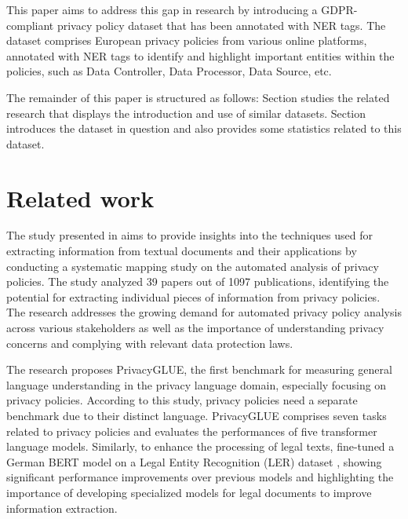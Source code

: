 \documentclass[a4paper,
               biblatex,     %
               hyphens,      %
               ]{jacow}
\begin{document}
This paper aims to address this gap in research by introducing a GDPR-compliant privacy policy dataset that has been annotated with NER tags. The dataset comprises European privacy policies from various online platforms, annotated with NER tags to identify and highlight important entities within the policies, such as Data Controller, Data Processor, Data Source, etc.
 
The remainder of this paper is structured as follows: Section  studies the related research that displays the introduction and use of similar datasets. Section  introduces the dataset in question and also provides some statistics related to this dataset.

\section{Related work} \label{section:related-work}

The study presented in \cite{del2022systematic} aims to provide insights into the techniques used for extracting information from textual documents and their applications by conducting a systematic mapping study on the automated analysis of privacy policies. The study analyzed 39 papers out of 1097 publications, identifying the potential for extracting individual pieces of information from privacy policies. The research addresses the growing demand for automated privacy policy analysis across various stakeholders as well as the importance of understanding privacy concerns and complying with relevant data protection laws.

The research \cite{shankar2023privacyglue} proposes PrivacyGLUE, the first benchmark for measuring general language understanding in the privacy language domain, especially focusing on privacy policies. According to this study, privacy policies need a separate benchmark due to their distinct language. PrivacyGLUE comprises seven tasks related to privacy policies and evaluates the performances of five transformer language models. Similarly, to enhance the processing of legal texts, \cite{darji2023german} fine-tuned a German BERT model on a Legal Entity Recognition (LER) dataset \cite{leitner2019fine}, showing significant performance improvements over previous models and highlighting the importance of developing specialized models for legal documents to improve information extraction.
\end{document}
